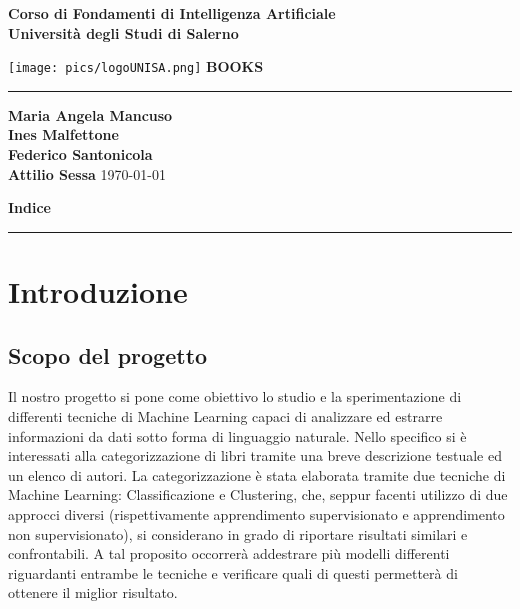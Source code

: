 \documentclass[12pt,oneside]{article}
\begin{document}
\begin{titlepage}
    \begin{flushright}
        \textbf{Corso di Fondamenti di Intelligenza Artificiale}
        \textbf{\\Università degli Studi di Salerno}
    \end{flushright}
    \vspace*{1.5cm}
    \centering
    \texttt{[image: pics/logoUNISA.png]}
    \vfill
    \Huge\textbf{BOOKS}
    \vspace{1ex}
    \rule{\linewidth}{1pt}
    \Large\textbf{Maria Angela Mancuso \\
        Ines Malfettone \\
        Federico Santonicola \\
        Attilio Sessa}
    \vfill
    \today
\end{titlepage}

\clearpage %

\setcounter{page}{1}

\begin{flushright}
        \Large\textbf{Indice}
\end{flushright}
\rule{\linewidth}{1pt}

\renewcommand{\contentsname}{}
\tableofcontents

\clearpage
\setcounter{section}{0}
\section{Introduzione}
    \begin{enumerate}
    \subsection{Scopo del progetto}
    \begin{justify}

        Il nostro progetto si pone come obiettivo lo studio e la sperimentazione di differenti tecniche di Machine Learning capaci di analizzare ed estrarre informazioni da dati sotto forma di linguaggio naturale. Nello specifico si è interessati alla categorizzazione di libri tramite una breve descrizione testuale ed un elenco di autori. La categorizzazione è stata elaborata tramite due tecniche di Machine Learning: Classificazione e Clustering, che, seppur facenti utilizzo di due approcci diversi (rispettivamente apprendimento supervisionato e apprendimento non supervisionato), si considerano in grado di riportare risultati similari e confrontabili. A tal proposito occorrerà addestrare più modelli differenti riguardanti entrambe le tecniche e verificare quali di questi permetterà di ottenere il miglior risultato.

    \end{justify}
    \end{enumerate}
\end{document}

